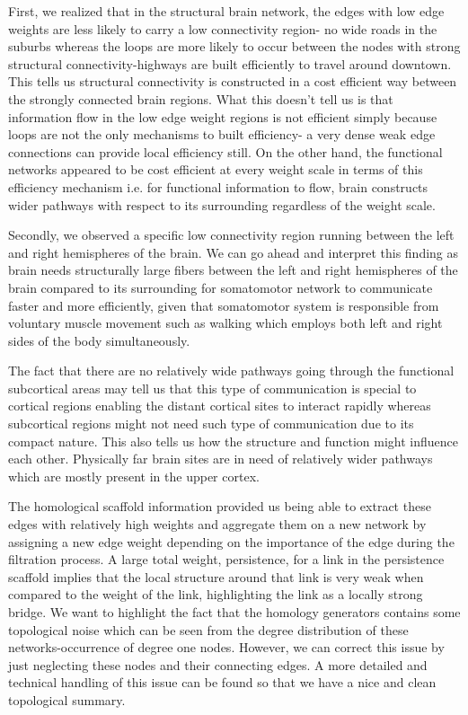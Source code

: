 \documentclass[9pt,twocolumn,twoside,lineno]{pnas-new}
\begin{document}
First, we realized that in the structural brain network, the edges with low edge weights are less likely to carry a low connectivity region- no wide roads in the suburbs whereas the loops are more likely to occur between the nodes with strong structural connectivity-highways are built efficiently to travel around downtown. This tells us structural connectivity is constructed in a cost efficient way between the strongly connected brain regions. What this doesn't tell us is that information flow in the low edge weight regions is not efficient simply because loops are not the only mechanisms to built efficiency- a very dense weak edge connections can provide local efficiency still. On the other hand, the functional networks appeared to be cost efficient at every weight scale in terms of this efficiency mechanism i.e. for functional information to flow, brain constructs wider pathways with respect to its surrounding regardless of the weight scale.

Secondly, we observed a specific low connectivity region running between the left and right hemispheres of the brain. We can go ahead and interpret this finding as brain needs structurally large fibers between the left and right hemispheres of the brain compared to its surrounding for somatomotor network to communicate faster and more efficiently, given that somatomotor system is responsible from voluntary muscle movement such as walking which employs both left and right sides of the body simultaneously. 

The fact that there are no relatively wide pathways going through the functional subcortical areas may tell us that this type of communication is special to cortical regions enabling the distant cortical sites to interact rapidly whereas subcortical regions might not need such type of communication due to its compact nature. This also tells us how the structure and function might influence each other. Physically far brain sites are in need of relatively wider pathways which are mostly present in the upper cortex. 


The homological scaffold information provided us being able to extract these edges with relatively high weights and aggregate them on a new network by assigning a new edge weight depending on the importance of the edge during the filtration process. A large total weight, persistence, for a link in the persistence scaffold implies that the local structure around that link is very weak when compared to the weight of the link, highlighting the link as a locally strong bridge. 
We want to highlight the fact that the homology generators contains some topological noise which can be seen from the degree distribution of these networks-occurrence of degree one nodes. However, we can correct this issue by just neglecting these nodes and their connecting edges. A more detailed and technical handling of this issue can be found \cite{optimalc1,optimalc2} so that we have a nice and clean topological summary. 
\end{document}
